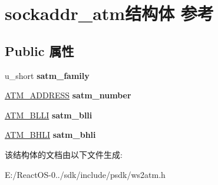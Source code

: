 \hypertarget{structsockaddr__atm}{}\section{sockaddr\+\_\+atm结构体 参考}
\label{structsockaddr__atm}
\subsection*{Public 属性}
\begin{DoxyCompactItemize}
\item 
\mbox{\label{structsockaddr__atm_ad8605cf6f307dddbe19295aeec797e5f}} 
u\+\_\+short {\bfseries satm\+\_\+family}
\item 
\mbox{\label{structsockaddr__atm_ac995874ffc43830232ac458d9d529fe6}} 
\hyperlink{struct_a_t_m___a_d_d_r_e_s_s}{A\+T\+M\+\_\+\+A\+D\+D\+R\+E\+SS} {\bfseries satm\+\_\+number}
\item 
\mbox{\label{structsockaddr__atm_a585be239f53c89bfcb467a0a90515c07}} 
\hyperlink{struct_a_t_m___b_l_l_i}{A\+T\+M\+\_\+\+B\+L\+LI} {\bfseries satm\+\_\+blli}
\item 
\mbox{\label{structsockaddr__atm_a8525933887cd7b9302449a52b2f1dc8c}} 
\hyperlink{struct_a_t_m___b_h_l_i}{A\+T\+M\+\_\+\+B\+H\+LI} {\bfseries satm\+\_\+bhli}
\end{DoxyCompactItemize}


该结构体的文档由以下文件生成\+:\begin{DoxyCompactItemize}
\item 
E\+:/\+React\+O\+S-\/0../sdk/include/psdk/ws2atm.\+h\end{DoxyCompactItemize}
